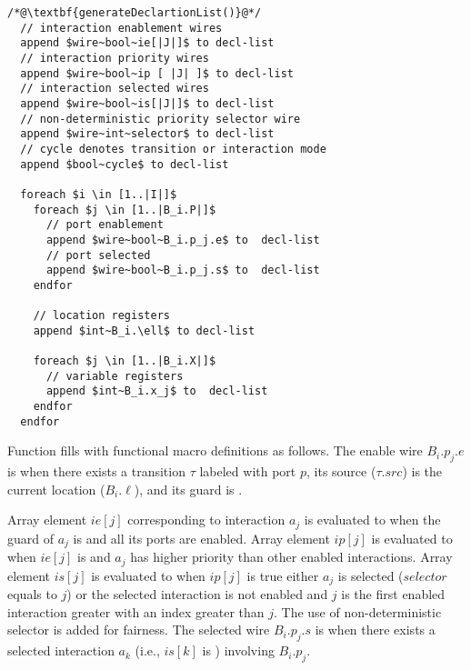 \begin{lstlisting}
/*@\textbf{generateDeclartionList()}@*/
  // interaction enablement wires
  append $wire~bool~ie[|J|]$ to decl-list
  // interaction priority wires
  append $wire~bool~ip [ |J| ]$ to decl-list 
  // interaction selected wires
  append $wire~bool~is[|J|]$ to decl-list 
  // non-deterministic priority selector wire
  append $wire~int~selector$ to decl-list 
  // cycle denotes transition or interaction mode
  append $bool~cycle$ to decl-list  

  foreach $i \in [1..|I|]$
    foreach $j \in [1..|B_i.P|]$ 
      // port enablement
      append $wire~bool~B_i.p_j.e$ to  decl-list 
      // port selected
      append $wire~bool~B_i.p_j.s$ to  decl-list 
    endfor

    // location registers
    append $int~B_i.\ell$ to decl-list
    
    foreach $j \in [1..|B_i.X|]$ 
      // variable registers
      append $int~B_i.x_j$ to  decl-list 
    endfor
  endfor
\end{lstlisting}


Function  fills  with functional macro definitions as follows. The enable wire $B_i.p_j.e$ is \true when there exists a transition $\tau$ labeled with port $p$, its source ($\tau.src$) is the current location ($B_i.\ell$), and its guard is \true. 

Array element $ie[j]$ corresponding to interaction $a_j$ is evaluated to \true when the guard of $a_j$ is \true and all its ports are enabled. Array element $ip[j]$ is evaluated to \true when $ie[j]$ is \true and $a_j$ has higher priority than other enabled interactions. Array element $is[j]$ is evaluated to \true when $ip[j]$ is true either $a_j$ is selected ($selector$ equals to $j$) or the selected interaction is not enabled and $j$ is the first enabled interaction greater with an index greater than $j$. The use of non-deterministic selector is added for fairness. 
The selected wire $B_i.p_j.s$ is \true when there exists a selected interaction $a_k$ (i.e., $is[k]$ is \true) involving $B_i.p_j$.

